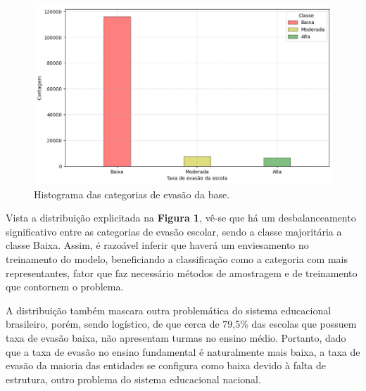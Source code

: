 \begin{figure}[H]
    \centering
    \includegraphics[scale = 0.6]{Graphics/Hist-Eva.png}
    \caption{Histograma das categorias de evasão da base.}
    \label{fig:hist-eva}
\end{figure}

\par Vista a distribuição explicitada na \textbf{Figura 1}, vê-se que há um desbalanceamento significativo entre as categorias de evasão escolar, sendo a classe majoritária a classe Baixa. Assim, é razoável inferir que haverá um enviesamento no treinamento do modelo, beneficiando a classificação como a categoria com mais representantes, fator que faz necessário métodos de amostragem e de treinamento que contornem o problema.

\par A distribuição também mascara outra problemática do sistema educacional brasileiro, porém, sendo logístico, de que cerca de 79,5\% das escolas que possuem taxa de evasão baixa, não apresentam turmas no ensino médio. Portanto, dado que a taxa de evasão no ensino fundamental é naturalmente mais baixa, a taxa de evasão da maioria das entidades se configura como baixa devido à falta de estrutura, outro problema do sistema educacional nacional.

